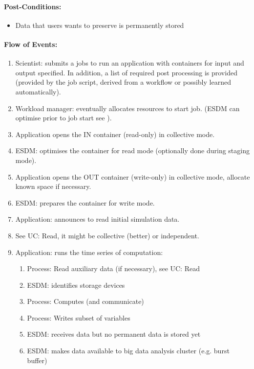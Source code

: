 \paragraph{Post-Conditions:}
\begin{itemize}
	\item Data that users wants to preserve is permanently stored
\end{itemize}




\paragraph{Flow of Events:}
\begin{enumerate}
	\item Scientist: submits a jobs to run an application with containers for input and output specified. In addition, a list of required post processing is provided (provided by the job script, derived from a workflow or possibly learned automatically).
	\item Workload manager: eventually allocates resources to start job. (ESDM can optimise prior to job start see ).
	\item Application opens the IN container (read-only) in collective mode.
	\item ESDM: optimises the container for read mode (optionally done during staging mode).
	\item Application opens the OUT container (write-only) in collective mode, allocate known space if necessary.
	\item ESDM: prepares the container for write mode.
	\item Application: announces to read initial simulation data.
	\item See UC: Read, it might be collective (better) or independent.
	\item Application: runs the time series of computation:
	\begin{enumerate}
		\item Process: Read auxiliary data (if necessary), see UC: Read
		\item ESDM: identifies storage devices
		\item Process: Computes (and communicate)
		\item Process: Writes subset of variables
		\item ESDM: receives data but no permanent data is stored yet
		\item ESDM: makes data available to big data analysis cluster (e.g. burst buffer)

\end{enumerate}
\end{enumerate}
